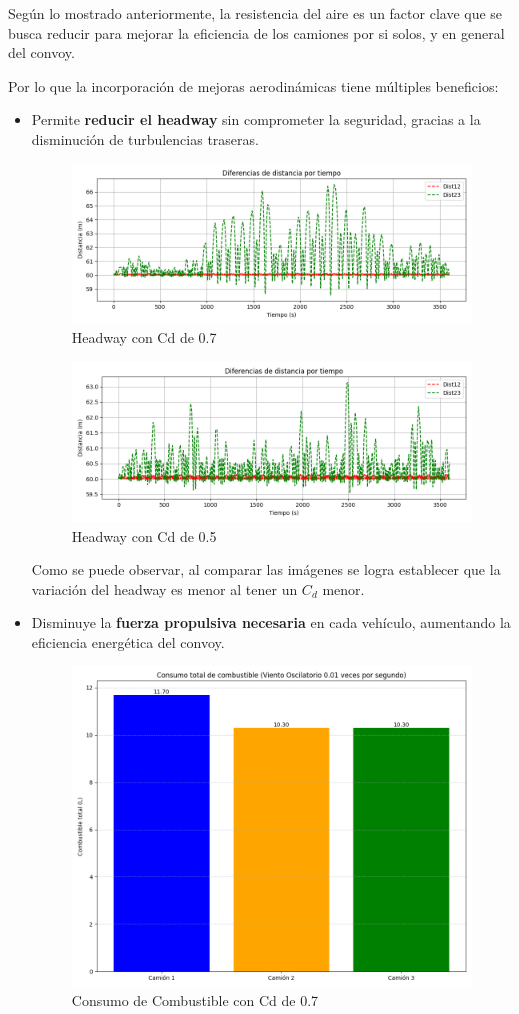 \documentclass[11pt,stdletter,orderfromtodate,sigleft,twoside]{report}
\begin{document}
Según lo mostrado anteriormente, la resistencia del aire es un factor clave que se busca reducir para mejorar la eficiencia de los camiones por si solos, y en general del convoy.

Por lo que la incorporación de mejoras aerodinámicas tiene múltiples beneficios:

\begin{itemize}
    \item Permite \textbf{reducir el headway} sin comprometer la seguridad, gracias a la disminución de turbulencias traseras.

    \begin{figure}[H]
        \centering
        \includegraphics[width=0.65\linewidth]{figures//Cars/distance_differences07.png}
        \caption{Headway con Cd de 0.7}
        \label{fig:enter-label}
    \end{figure}

    \begin{figure}[H]
        \centering
        \includegraphics[width=0.65\linewidth]{figures//Cars/distance_differences cd0.5.png}
        \caption{Headway con Cd de 0.5}
        \label{fig:enter-label}
    \end{figure}

    Como se puede observar, al comparar las imágenes se logra establecer que la variación del headway es menor al tener un \(C_d\) menor.

    
    \item Disminuye la \textbf{fuerza propulsiva necesaria} en cada vehículo, aumentando la eficiencia energética del convoy.

    \begin{figure}[H]
        \centering
        \includegraphics[width=0.45\linewidth]{figures//Cars/total_fuel_consumption 0.7.png}
        \caption{Consumo de Combustible con Cd de 0.7}
        \label{fig:enter-label}
    \end{figure}


\end{itemize}
\end{document}

